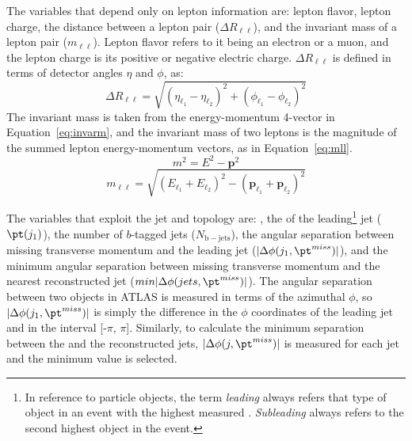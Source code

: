 The variables that depend only on lepton information are: lepton flavor, lepton charge, the distance between a lepton pair ($\Delta R_{\ell\ell}$), and the invariant mass of a lepton pair ($m_{\ell\ell}$).  Lepton flavor refers to it being an electron or a muon, and the lepton charge is its positive or negative electric charge.  $\Delta R_{\ell\ell}$ is defined in terms of detector angles $\eta$ and $\phi$, as:
\begin{equation}
\Delta R_{\ell\ell} = \sqrt{(\eta_{\ell_1}-\eta_{\ell_2})^2+(\phi_{\ell_1}-\phi_{\ell_2})^2}
\end{equation} 
The invariant mass is taken from the energy-momentum 4-vector in Equation~\ref{eq:invarm}, and the invariant mass of two leptons is the magnitude of the summed lepton energy-momentum vectors, as in Equation~\ref{eq:mll}.
 \begin{equation}
m^2 = E^2-\mathbf{p}^2
\label{eq:invarm}
\end{equation} 
 \begin{equation}
m_{\ell\ell} = \sqrt{(E_{\ell_1}+E_{\ell_2})^2 - (\mathbf{p}_{\ell_1}+\mathbf{p}_{\ell_2})^2}
\label{eq:mll}
\end{equation} 

The variables that exploit the jet and \met topology are: \met{}, the \pt of the leading\footnote{In reference to particle objects, the term \textit{leading} always refers that type of object in an event with the highest measured \pt{}.  \textit{Subleading} always refers to the second highest \pt{} object in the event.} jet ($\pt(j_1)$), the number of $b$-tagged jets ($N_\mathrm{b-jets}$), the angular separation between missing transverse momentum and the leading jet ($|\Delta\phi(j_1, \pt^{miss})|$), and the minimum angular separation between missing transverse momentum and the nearest reconstructed jet ($min|\Delta\phi(jets, \pt^{miss})|$).  The angular separation between two objects in ATLAS is measured in terms of the azimuthal $\phi$, so $|\Delta\phi(j_1, \pt^{miss})|$ is simply the difference in the $\phi$ coordinates of the leading jet and \met{} in the interval [-$\pi$, $\pi$].  Similarly, to calculate the minimum separation between the \met and the reconstructed jets, $|\Delta\phi(j, \pt^{miss})|$ is measured for each jet and the minimum value is selected.

